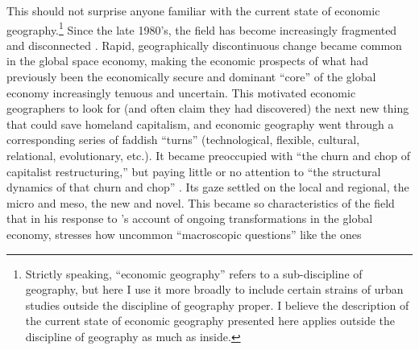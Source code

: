 This should not surprise anyone familiar with the current state of
economic geography.\footnote{Strictly speaking, ``economic geography'' refers to a sub-discipline
of geography, but here I use it more broadly to include certain strains
of urban studies outside the discipline of geography proper. I believe
the description of the current state of economic geography presented
here applies outside the discipline of geography as much as inside.} Since the late 1980's, the field has become increasingly fragmented
and disconnected \citep{scott07economic,barnes2010nothing}. Rapid,
geographically discontinuous change became common in the global space
economy, making the economic prospects of what had previously been
the economically secure and dominant ``core'' of the global economy
increasingly tenuous and uncertain. This motivated economic geographers
to look for (and often claim they had discovered) the next new thing
that could save homeland capitalism, and economic geography went through
a corresponding series of faddish ``turns'' (technological, flexible,
cultural, relational, evolutionary, etc.). It became preoccupied with
``the churn and chop of capitalist restructuring,'' but paying little
or no attention to ``the structural dynamics of that churn and chop''
\citet[11]{peck2016macroeconomic}. Its gaze settled on the local
and regional, the micro and meso, the new and novel. This became so
characteristics of the field that in his response to \citeauthor{hudson2016risingpowers}'s
\citeyearpar{hudson2016risingpowers} account of ongoing transformations
in the global economy, \citet{Peck_2016_Macroeconomic} stresses how
uncommon ``macroscopic questions'' like the ones \citeauthor{hudson2016risingpowers}
